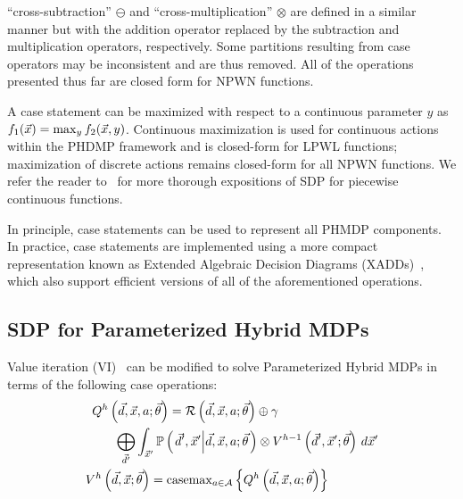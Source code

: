 ``cross-subtraction'' {\footnotesize$\ominus$} and ``cross-multiplication'' {\footnotesize$\otimes$} are defined in a similar manner but with the addition operator replaced by the subtraction and multiplication operators, respectively. Some partitions resulting from case operators may be inconsistent and are thus removed. All of the operations presented thus far are closed form for NPWN functions.

A case statement can be maximized with respect to a continuous parameter {\footnotesize$y$} as {\footnotesize $ f_1(\vec{x}) = \contmax_{y}f_2(\vec{x}, y) $}. Continuous maximization is used for continuous actions within the PHDMP framework and is closed-form for LPWL functions; maximization of discrete actions remains closed-form for all NPWN functions. We refer the reader to~\cite{Sanner_UAI_2011,Zamani_AAAI_2012} for more thorough expositions of SDP for piecewise continuous functions.

In principle, case statements can be used to represent all PHMDP components. In practice, case statements are implemented using a more compact representation known as Extended Algebraic Decision Diagrams (XADDs)~\cite{Sanner_UAI_2011}, which also support efficient versions of all of the aforementioned operations. 

\subsection{SDP for Parameterized Hybrid MDPs}

Value iteration (VI)~\cite{Bellman_PU_1957} can be modified to solve Parameterized Hybrid MDPs in terms of the following case operations:
{\footnotesize 
    \abovedisplayskip=0pt
    \belowdisplayskip=0pt
    \begin{align}
        Q^{h} \left( \vec{d}, \vec{x}, a; \vec{\theta} \right) = \mathcal{R} \left( \vec{d}, \vec{x}, a; \vec{\theta} \right) \oplus \gamma \qquad \qquad \qquad \qquad &  \nonumber \\ 
        \bigoplus_{\vec{d}'} \int_{\vec{x}'} \mathbb{P}\left({ \left. \vec{d}', \vec{x}' \middle| \vec{d}, \vec{x}, a; \vec{\theta} \right.}\right) \otimes V^{h-1} \left( \vec{d}', \vec{x}'; \vec{\theta} \right) \, d\vec{x}' & \label{eq:vi_sdp_qfunc} \\
        V^{h}\left( \vec{d}, \vec{x}; \vec{\theta} \right) = \mathrm{casemax}_{a \in \mathcal{A}} \left\{ Q^{h} \left( \vec{d}, \vec{x}, a; \vec{\theta} \right) \right\} \qquad \qquad & \label{eq:vi_sdp_vfunc}
    \end{align}
}%

